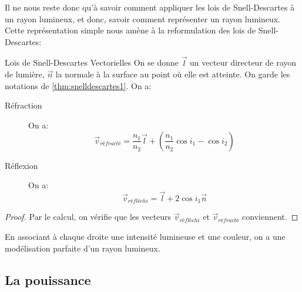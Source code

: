 \documentclass{classe}
\begin{document}
Il ne nous reste donc qu'à savoir comment appliquer les lois de Snell-Descartes à un rayon lumineux, et donc, savoir comment représenter un rayon lumineux.
Cette représentation simple nous amène à la reformulation des lois de Snell-Descartes:
\begin{propositionfr}{Lois de Snell-Descartes Vectorielles}{}
	On se donne $\overrightarrow{l}$ un vecteur directeur de rayon de lumière, $\vec{n}$ la normale à la surface au point où elle est atteinte.
	On garde les notations de \ref{thm:snelldescartes1}.
	On a:
	\begin{description}
		\item[Réfraction] On a:
			\begin{equation}
				\vec{v}_{réfracté} = \frac{n_{1}}{n_{2}}\vec{l} + \left(\frac{n_{1}}{n_{2}}\cos i_{1} - \cos i_{2}\right)
				\label{snelldescartesrefraction}
			\end{equation}
		\item[Réflexion] On a:
			\begin{equation}
				\vec{v}_{réfléchi} = \vec{l} + 2\cos i_{1}\vec{n}
				\label{snelldescartesreflexion}
			\end{equation}
	\end{description}
\end{propositionfr}
\begin{proof}
	Par le calcul, on vérifie que les vecteurs $\vec{v}_{réfléchi}$ et $\vec{v}_{réfracté}$ conviennent.
\end{proof}
En associant à chaque droite une intensité lumineuse et une couleur, on a une modélisation parfaite d'un rayon lumineux.

\subsection{La pouissance}
\end{document}
